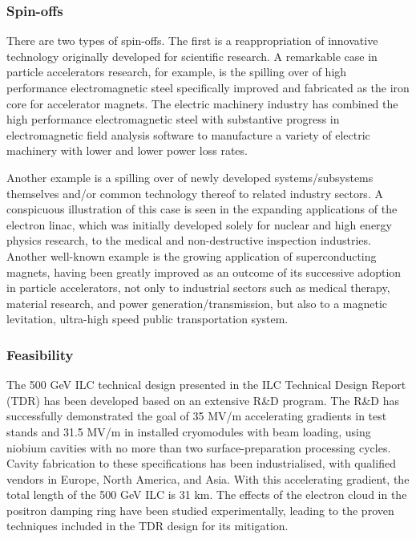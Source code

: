 \subsubsection{Spin-offs}

There are two types of spin-offs. The first is a reappropriation of innovative
technology originally developed for scientific research. A remarkable case in particle
accelerators research, for example, is the spilling over of high performance
electromagnetic steel specifically improved and fabricated as the iron core for accelerator magnets. The electric machinery industry has combined the high performance electromagnetic steel with substantive progress in electromagnetic field analysis software to manufacture a variety of electric machinery with lower and lower power loss rates. 

Another example is a spilling over of newly developed systems/subsystems themselves and/or common technology thereof to related industry sectors. A conspicuous illustration of this case is seen in the expanding applications of the electron linac, which was initially developed solely for nuclear and high energy physics research, to the medical and non-destructive inspection industries. Another well-known example is the growing application of superconducting magnets, having been greatly improved as an outcome of its successive adoption in particle accelerators, not only to industrial sectors such as medical therapy, material research, and power generation/transmission, but also to a magnetic levitation, ultra-high speed public transportation system. \cite{ILC:SpinOffReport}
 
\subsubsection{Feasibility}

The 500 GeV ILC technical design presented in the ILC Technical Design Report (TDR) \cite{ILC:TechnicalDesignReport} has been developed based on an extensive R\&D program. The R\&D has successfully demonstrated the goal of 35 MV/m accelerating gradients in test stands and 31.5 MV/m in installed cryomodules with beam loading, using niobium cavities with no more than two surface-preparation processing cycles. Cavity fabrication to these specifications has been industrialised, with qualified vendors in Europe, North America, and Asia. With this accelerating gradient, the total length of the 500 GeV ILC is 31 km. The effects of the electron cloud in the positron damping ring have been studied experimentally, leading to the proven techniques included in the TDR design for its mitigation.  

